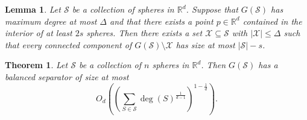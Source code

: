 \documentclass[10pt,a4paper]{amsart}
\newtheorem{lemma}{Lemma}
\newtheorem{theorem}{Theorem}
\newcommand{\R}{\mathbb R}
\newcommand{\fS}{\mathcal S}
\newcommand{\fX}{\mathcal X}
\newcommand{\paren}[1]{\left( #1 \right)}
\begin{document}
\begin{lemma}
\label{lem:nested-sphere-separator}
Let $\fS$ be a collection of spheres in $\R^d$. Suppose that $G(\fS)$ has maximum degree at most $\Delta$ and that there exists a point $p\in\R^d$ contained in the interior of at least $2s$ spheres. Then there exists a set $\fX\subseteq\fS$ with $|\fX|\leq\Delta$ such that every connected component of $G(\fS)\setminus\fX$ has size at most $|\fS|-s$.
\end{lemma}

\begin{theorem}
\label{thm:sphere-separator-main}
Let $\fS$ be a collection of $n$ spheres in $\R^d$. Then $G(\fS)$ has a balanced separator of size at most
\[O_d\paren{\paren{\sum_{S\in\fS}\deg(S)^{\tfrac1{d-1}}}^{1-\tfrac1d}}.\]
\end{theorem}
\end{document}
